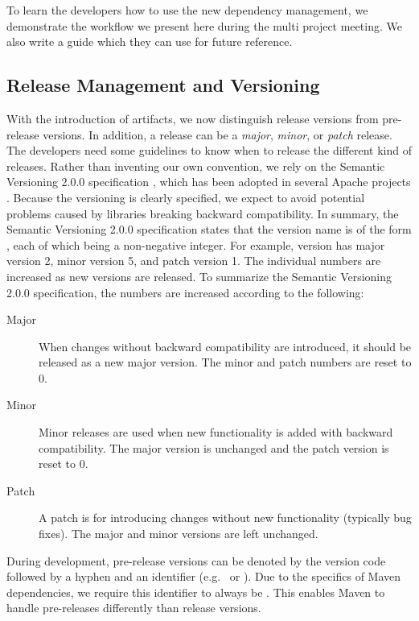 To learn the developers how to use the new dependency management, we demonstrate the workflow we present here during the multi project meeting. We also write a guide which they can use for future reference.

\subsection{Release Management and Versioning}
With the introduction of artifacts, we now distinguish release versions from pre-release versions. In addition, a release can be a \emph{major}, \emph{minor}, or \emph{patch} release. The developers need some guidelines to know when to release the different kind of releases. Rather than inventing our own convention, we rely on the Semantic Versioning 2.0.0 specification \parencite{semver2015}, which has been adopted in several Apache projects \parencite{apacheapr,apacheisis,apacheaccumulo}. Because the versioning is clearly specified, we expect to avoid potential problems caused by libraries breaking backward compatibility. In summary, the Semantic Versioning 2.0.0 specification states that the version name is of the form , each of which being a non-negative integer. For example, version  has major version 2, minor version 5, and patch version 1. The individual numbers are increased as new versions are released. To summarize the Semantic Versioning 2.0.0 specification, the numbers are increased according to the following:
\begin{description}
  \item[Major] When changes without backward compatibility are introduced, it should be released as a new major version. The minor and patch numbers are reset to 0.
  \item[Minor] Minor releases are used when new functionality is added with backward compatibility. The major version is unchanged and the patch version is reset to 0.
  \item[Patch] A patch is for introducing changes without new functionality (typically bug fixes). The major and minor versions are left unchanged.
\end{description}

During development, pre-release versions can be denoted by the version code followed by a hyphen and an identifier (e.g.\  or ). Due to the specifics of Maven dependencies, we require this identifier to always be . This enables Maven to handle pre-releases differently than release versions.

